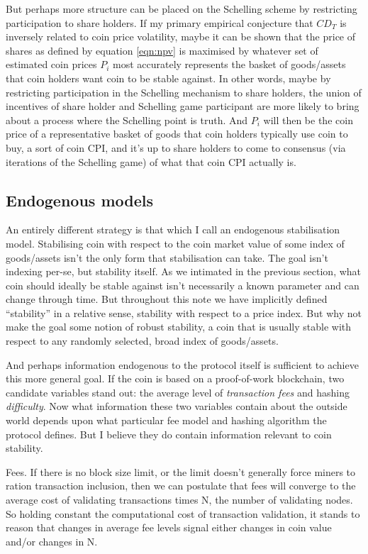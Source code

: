 \documentclass[twocolumn]{article}
\begin{document}
But perhaps more structure can be placed on the Schelling scheme by
restricting participation to share holders. If my primary empirical
conjecture that $CD_{T}$ is inversely related to coin price
volatility, maybe it can be shown that the price of shares as defined
by equation \ref{eqn:npv} is maximised by whatever set of estimated
coin prices $P_{i}$ most accurately represents the basket of
goods/assets that coin holders want coin to be stable against. In
other words, maybe by restricting participation in the Schelling
mechanism to share holders, the union of incentives of share holder
and Schelling game participant are more likely to bring about a
process where the Schelling point is truth. And $P_{i}$ will then be
the coin price of a representative basket of goods that coin holders
typically use coin to buy, a sort of coin CPI, and it's up to share
holders to come to consensus (via iterations of the Schelling game) of
what that coin CPI actually is. 

\subsection*{Endogenous models}
An entirely different strategy is that which I call an endogenous
stabilisation model. Stabilising coin with respect to the coin market
value of some index of goods/assets isn't the only form that
stabilisation can take. The goal isn't indexing per-se, but stability
itself. As we intimated in the previous section, what coin should
ideally be stable against isn't necessarily a known parameter and can
change through time. But throughout this note we have implicitly
defined ``stability'' in a relative sense, stability with respect to a
price index. But why not make the goal some notion of robust
stability, a coin that is usually stable with respect to any randomly
selected, broad index of goods/assets.

And perhaps information endogenous to the protocol itself is
sufficient to achieve this more general goal. If the coin is based on
a proof-of-work blockchain, two candidate variables stand out: the
average level of \emph{transaction fees} and hashing
\emph{difficulty}. Now what information these two variables contain
about the outside world depends upon what particular fee model and
hashing algorithm the protocol defines. But I believe they do contain
information relevant to coin stability. 

Fees. If there is no block size limit, or the limit doesn't generally
force miners to ration transaction inclusion, then we can postulate
that fees will converge to the average cost of validating transactions
times N, the number of validating nodes. So holding constant the
computational cost of transaction validation, it stands to reason that
changes in average fee levels signal either changes in coin value
and/or changes in N.
\end{document}
